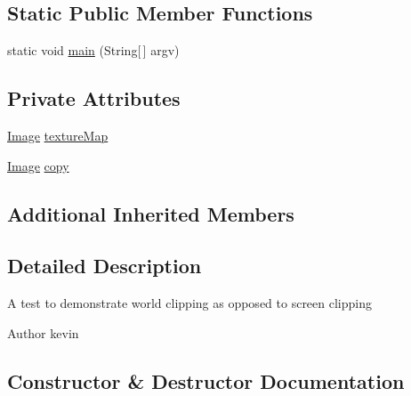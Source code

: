 \subsection*{Static Public Member Functions}
\begin{DoxyCompactItemize}
\item 
static void \mbox{\hyperlink{classorg_1_1newdawn_1_1slick_1_1tests_1_1_copy_area_alpha_test_a8951242f70d532c48647bbcfeac17594}{main}} (String\mbox{[}$\,$\mbox{]} argv)
\end{DoxyCompactItemize}
\subsection*{Private Attributes}
\begin{DoxyCompactItemize}
\item 
\mbox{\hyperlink{classorg_1_1newdawn_1_1slick_1_1_image}{Image}} \mbox{\hyperlink{classorg_1_1newdawn_1_1slick_1_1tests_1_1_copy_area_alpha_test_a3ac052d3b96d0a06b587b856f390f0bd}{texture\+Map}}
\item 
\mbox{\hyperlink{classorg_1_1newdawn_1_1slick_1_1_image}{Image}} \mbox{\hyperlink{classorg_1_1newdawn_1_1slick_1_1tests_1_1_copy_area_alpha_test_a65e4d5c340fc8e416483cfb8e9cce6be}{copy}}
\end{DoxyCompactItemize}
\subsection*{Additional Inherited Members}


\subsection{Detailed Description}
A test to demonstrate world clipping as opposed to screen clipping

\begin{DoxyAuthor}{Author}
kevin 
\end{DoxyAuthor}


\subsection{Constructor \& Destructor Documentation}
\mbox{\label{classorg_1_1newdawn_1_1slick_1_1tests_1_1_copy_area_alpha_test_a95cd6685fac4e989127bcaa9c008d1c0}} 
